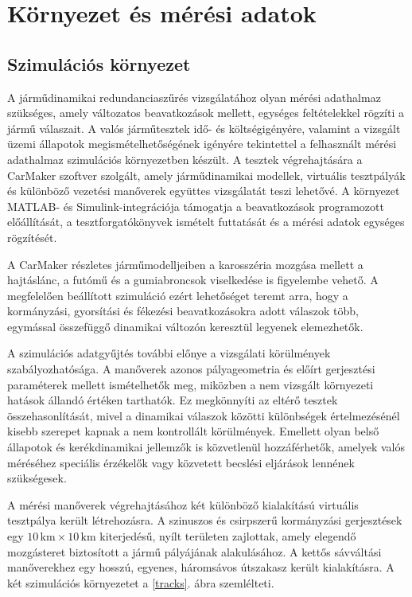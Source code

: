 \documentclass[12pt,a4paper,onehalfspacing, oneside]{book} %
\begin{document}
\chapter{Környezet és mérési adatok}\label{ch:kornyezet}
\section{Szimulációs környezet}
A járműdinamikai redundanciaszűrés vizsgálatához olyan mérési adathalmaz szükséges, amely változatos beavatkozások mellett, egységes feltételekkel rögzíti a jármű válaszait. A valós járműtesztek idő- és költségigényére, valamint a vizsgált üzemi állapotok megismételhetőségének igényére tekintettel a felhasznált mérési adathalmaz szimulációs környezetben készült. A tesztek végrehajtására a CarMaker szoftver szolgált, amely járműdinamikai modellek, virtuális tesztpályák és különböző vezetési manőverek együttes vizsgálatát teszi lehetővé. A környezet MATLAB- és Simulink-integrációja támogatja a beavatkozások programozott előállítását, a tesztforgatókönyvek ismételt futtatását és a mérési adatok egységes rögzítését.

A CarMaker részletes járműmodelljeiben a karosszéria mozgása mellett a hajtáslánc, a futómű és a gumiabroncsok viselkedése is figyelembe vehető. A megfelelően beállított szimuláció ezért lehetőséget teremt arra, hogy a kormányzási, gyorsítási és fékezési beavatkozásokra adott válaszok több, egymással összefüggő dinamikai változón keresztül legyenek elemezhetők.

A szimulációs adatgyűjtés további előnye a vizsgálati körülmények szabályozhatósága. A manőverek azonos pályageometria és előírt gerjesztési paraméterek mellett ismételhetők meg, miközben a nem vizsgált környezeti hatások állandó értéken tarthatók. Ez megkönnyíti az eltérő tesztek összehasonlítását, mivel a dinamikai válaszok közötti különbségek értelmezésénél kisebb szerepet kapnak a nem kontrollált körülmények. Emellett olyan belső állapotok és kerékdinamikai jellemzők is közvetlenül hozzáférhetők, amelyek valós méréséhez speciális érzékelők vagy közvetett becslési eljárások lennének szükségesek.

A mérési manőverek végrehajtásához két különböző kialakítású virtuális tesztpálya került létrehozásra. A szinuszos és csirpszerű kormányzási gerjesztések egy $10\,\mathrm{km}\times10\,\mathrm{km}$ kiterjedésű, nyílt területen zajlottak, amely elegendő mozgásteret biztosított a jármű pályájának alakulásához. A kettős sávváltási manőverekhez egy hosszú, egyenes, háromsávos útszakasz került kialakításra. A két szimulációs környezetet a \ref{tracks}. ábra szemlélteti.
\end{document}
